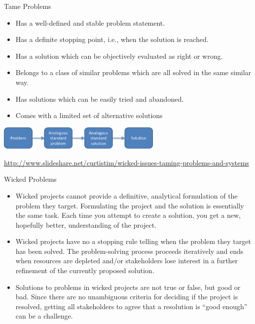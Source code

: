 \documentclass{beamer}
\begin{document}
\begin{frame}{\centerline{Tame Problems}}
\begin{itemize}
\item Has a well-defined and stable problem statement.
\item Has a definite stopping point, i.e., when the solution is reached.
\item Has a solution which can be objectively evaluated as right or wrong.
\item Belongs to a class of similar problems which are all solved in the same similar way.
\item Has solutions which can be easily tried and abandoned.
\item Comes with a limited set of alternative solutions
\end{itemize}
\begin{center}
\includegraphics[width=80mm]{A2022.IDSEPC.ProcessoDiProduzione/pic-04.png}
\end{center}

\begin{center}
\tiny
\url{http://www.slideshare.net/curtistim/wicked-issues-taming-problems-and-systems}
\end{center}

\end{frame}


\begin{frame}{\centerline{Wicked Problems}}
\small
\begin{itemize}
\item Wicked projects cannot provide a definitive, analytical formulation of the problem they target. Formulating the project and the solution is essentially the same task. Each time you attempt to create a solution, you get a new, hopefully better, understanding of the project.

\item Wicked projects have no a stopping rule telling when the problem they target has been solved. The problem-solving process proceeds iteratively and ends when resources are depleted and/or stakeholders lose interest in a further refinement of the currently proposed solution.

\item Solutions to problems in wicked projects are not true or false, but good or bad. Since there are no unambiguous criteria for deciding if the project is resolved, getting all stakeholders to agree that a resolution is ``good enough'' can be a challenge.
\end{itemize}

\end{frame}
\end{document}
